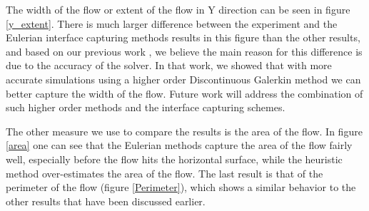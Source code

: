 \documentclass[review]{elsarticle}
\begin{document}
The width of the flow or extent of the flow in Y direction can be seen in figure \ref{y_extent}. 
There is much larger difference between the experiment and the Eulerian interface capturing methods results in this figure than the other results, 
and based on our previous work \cite{Patra2006}, we believe the main reason for this difference is due to the accuracy of the solver. 
In that work, we showed that with more accurate simulations using a higher order Discontinuous Galerkin method we can better capture the width of the flow.
Future work will address the combination of such higher order methods and the interface capturing schemes.

The other measure we use to compare the results is the area of the flow. 
In figure \ref{area}  one can see that the Eulerian methods capture the area of the flow fairly well,
especially before the flow hits the horizontal surface, while the heuristic method over-estimates the area of the flow. 
The last result is that of the perimeter of the flow (figure \ref{Perimeter}), which shows a similar behavior 
to the other results that have been discussed earlier. 
\end{document}
